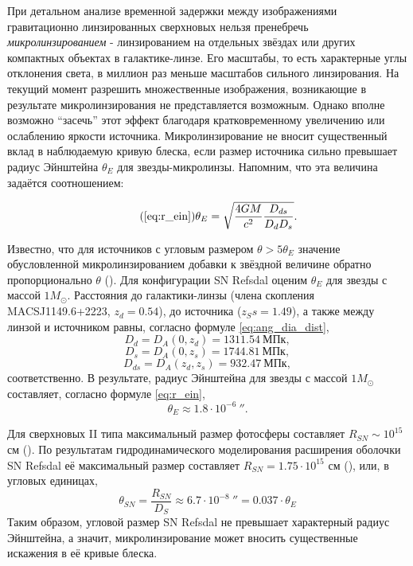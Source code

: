 При детальном анализе временной задержки между изображениями гравитационно линзированных сверхновых нельзя пренебречь \textit{микролинзированием} - линзированием на отдельных звёздах или других компактных объектах в галактике-линзе. Его масштабы, то есть характерные углы отклонения света, в миллион раз меньше масштабов сильного линзирования. На текущий момент разрешить множественные изображения, возникающие в результате микролинзирования не представляется возможным. Однако вполне возможно “засечь” этот эффект благодаря кратковременному увеличению или ослаблению яркости источника. Микролинзирование не вносит существенный вклад в наблюдаемую кривую блеска, если размер источника сильно превышает радиус Эйнштейна $\theta_E$ для звезды-микролинзы. Напомним, что эта величина задаётся соотношением:

\begin{equation}\tag{\ref{eq:r_ein}}
\theta_{E}=\sqrt{\frac{4 G M}{c^{2}} \frac{D_{d s}}{D_{d} D_{s}}}.
\end{equation}

Известно, что для источников с угловым размером $\theta > 5\theta_E$ значение обусловленной микролинзированием добавки к звёздной величине обратно пропорционально $\theta$ (\cite{refsdalstabell1991}). Для конфигурации SN Refsdal оценим $\theta_E$ для звезды с массой $1 M_{\odot}$. Расстояния до галактики-линзы (члена скопления MACSJ1149.6+2223, $z_d=0.54$), до источника ($z_Ss=1.49$), а также между линзой и источником равны, согласно формуле \eqref{eq:ang_dia_dist}, 
$$ D_d=D_A(0,z_d)=1311.54 \ \textrm{МПк}, $$
$$ D_s=D_A(0,z_s)=1744.81 \ \textrm{МПк}, $$
$$ D_{ds}=D_A(z_d,z_s)=932.47 \ \textrm{МПк}, $$
соответственно. В результате, радиус Эйнштейна для звезды с массой $1 M_{\odot}$ составляет, согласно формуле \eqref{eq:r_ein}, $$\theta_E \approx 1.8 \cdot 10^{-6} \ ''. $$ 

Для сверхновых II типа максимальный размер фотосферы составляет $R_{SN} \sim 10^{15}$ см (\cite{razmer}). По результатам гидродинамического моделирования расширения оболочки SN Refsdal её максимальный размер составляет $R_{SN} = 1.75\cdot10^{15}$ см (\cite{petrnat2020}), или, в угловых единицах, $$\theta_{SN} = \frac{R_{SN}}{D_S} \approx 6.7 \cdot 10^{-8} \ '' =  0.037 \cdot \theta_E $$  Таким образом, угловой размер SN Refsdal не превышает характерный радиус Эйнштейна, а значит, микролинзирование может вносить существенные искажения в её кривые блеска. %

